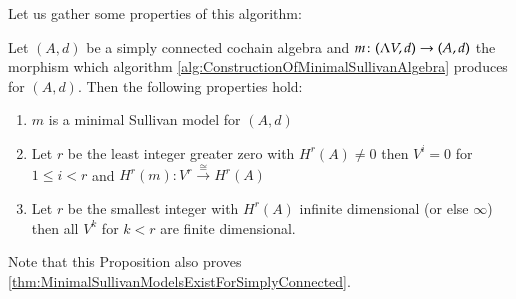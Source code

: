 Let us gather some properties of this algorithm:
\begin{Proposition}
 Let $(A,d)$ be a simply connected cochain algebra and $m \colon (\Lambda V,d) \to (A,d)$ the morphism which
 algorithm \ref{alg:ConstructionOfMinimalSullivanAlgebra} produces for $(A,d)$. Then the following properties hold:
 \begin{enumerate}
  \item $m$ is a minimal Sullivan model for $(A,d)$
  \item Let $r$ be the least integer greater zero with $H^r(A) \neq 0$ then $V^i = 0$ for $1 \leq i < r$ and
    $H^r(m) \colon V^r \overset{\cong}{\to} H^r(A)$
  \item Let $r$ be the smallest integer with $H^r(A)$ infinite dimensional (or else $\infty$) then
    all $V^k$ for $k < r$ are finite dimensional.
 \end{enumerate}

\end{Proposition}
Note that this Proposition also proves \ref{thm:MinimalSullivanModelsExistForSimplyConnected}.
